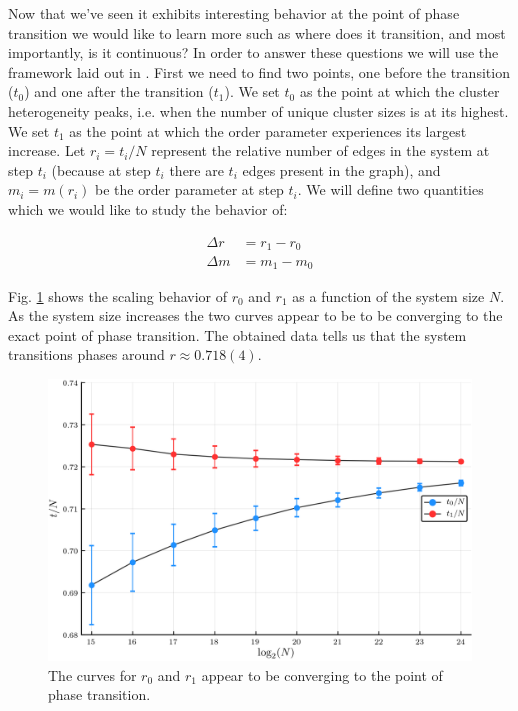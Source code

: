 Now that we've seen it exhibits interesting behavior at the point of phase transition we would like to learn more such as where does it transition, and most importantly, is it continuous?
In order to answer these questions we will use the framework laid out in \cite{Lee_1}.
First we need to find two points, one before the transition ($t_0$) and one after the transition ($t_1$).
We set $t_0$ as the point at which the cluster heterogeneity peaks, i.e. when the number of unique cluster sizes is at its highest.
We set $t_1$ as the point at which the order parameter experiences its largest increase.
Let $r_i = t_i / N$ represent the relative number of edges in the system at step $t_i$ (because at step $t_i$ there are $t_i$ edges present in the graph), and $m_i = m(r_i)$ be the order parameter at step $t_i$.
We will define two quantities which we would like to study the behavior of:

\begin{equation}
\begin{split}
	\Delta r &= r_1 - r_0 \\
	\Delta m &= m_1 - m_0
\end{split}
\end{equation}

Fig. \ref{fig:r_scaling} shows the scaling behavior of $r_0$ and $r_1$ as a function of the system size $N$.
As the system size increases the two curves appear to be to be converging to the exact point of phase transition.
The obtained data tells us that the system transitions phases around $r \approx 0.718(4)$.

\begin{figure}[H]
	\centering
	\includegraphics[width=350pt, clip]{images/r_scaling.png}
	\caption{The curves for $r_0$ and $r_1$ appear to be converging to the point of phase transition.}
	\label{fig:r_scaling}
\end{figure}

